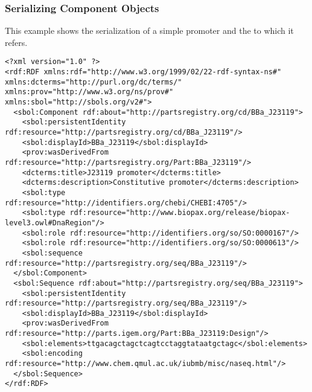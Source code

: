 \subsubsection{Serializing Component Objects}
This example shows the serialization of a simple promoter  and the  to which it refers.
\begin{lstlisting}
<?xml version="1.0" ?>
<rdf:RDF xmlns:rdf="http://www.w3.org/1999/02/22-rdf-syntax-ns#" xmlns:dcterms="http://purl.org/dc/terms/" xmlns:prov="http://www.w3.org/ns/prov#" xmlns:sbol="http://sbols.org/v2#">
  <sbol:Component rdf:about="http://partsregistry.org/cd/BBa_J23119">
    <sbol:persistentIdentity rdf:resource="http://partsregistry.org/cd/BBa_J23119"/>
    <sbol:displayId>BBa_J23119</sbol:displayId>
    <prov:wasDerivedFrom rdf:resource="http://partsregistry.org/Part:BBa_J23119"/>
    <dcterms:title>J23119 promoter</dcterms:title>
    <dcterms:description>Constitutive promoter</dcterms:description>
    <sbol:type rdf:resource="http://identifiers.org/chebi/CHEBI:4705"/>
    <sbol:type rdf:resource="http://www.biopax.org/release/biopax-level3.owl#DnaRegion"/>
    <sbol:role rdf:resource="http://identifiers.org/so/SO:0000167"/>
    <sbol:role rdf:resource="http://identifiers.org/so/SO:0000613"/>
    <sbol:sequence rdf:resource="http://partsregistry.org/seq/BBa_J23119"/>
  </sbol:Component>
  <sbol:Sequence rdf:about="http://partsregistry.org/seq/BBa_J23119">
    <sbol:persistentIdentity rdf:resource="http://partsregistry.org/seq/BBa_J23119"/>
    <sbol:displayId>BBa_J23119</sbol:displayId>
    <prov:wasDerivedFrom rdf:resource="http://parts.igem.org/Part:BBa_J23119:Design"/>
    <sbol:elements>ttgacagctagctcagtcctaggtataatgctagc</sbol:elements>
    <sbol:encoding rdf:resource="http://www.chem.qmul.ac.uk/iubmb/misc/naseq.html"/>
  </sbol:Sequence>
</rdf:RDF>
\end{lstlisting}

